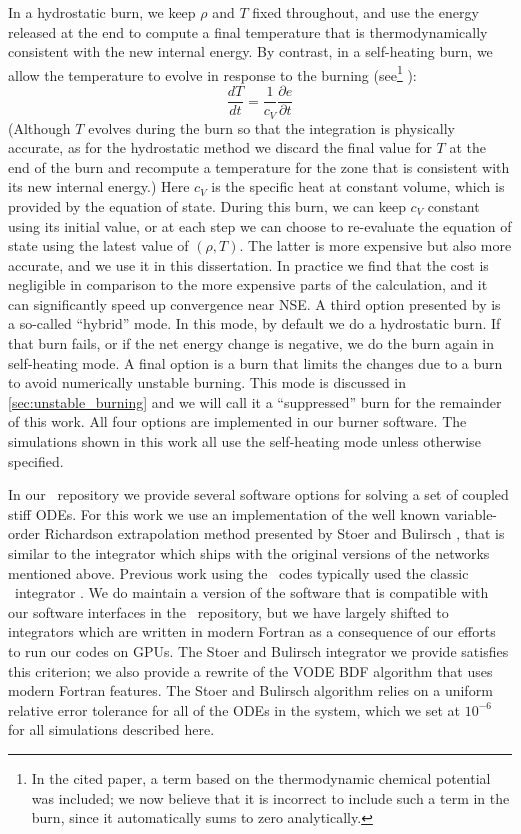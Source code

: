 \documentclass[12pt]{article}
\begin{document}
In a hydrostatic burn, we keep $\rho$ and $T$ fixed throughout, and use
the energy released at the end to compute a final temperature that is
thermodynamically consistent with the new internal energy. By contrast,
in a self-heating burn, we allow the temperature to evolve in response
to the burning (see\footnote{In the cited paper, a term based on the
thermodynamic chemical potential was included; we now believe
that it is incorrect to include such a term in the burn, since it
automatically sums to zero analytically.} \citet{maestro3}):
\begin{equation}
  \frac{dT}{dt} = \frac{1}{c_V}\frac{\partial e}{\partial t}
\end{equation}
(Although $T$ evolves during the burn so that the integration is physically
accurate, as for the hydrostatic method we discard the final value
for $T$ at the end of the burn and recompute a temperature for the zone that is
consistent with its new internal energy.) Here $c_V$ is the specific heat at
constant volume, which is provided by the equation of state.  During this burn,
we can keep $c_V$ constant using its initial value, or at each step we
can choose to re-evaluate the equation of state using the latest value of $(\rho, T)$.
The latter is more expensive but also more accurate, and we use it in this dissertation.
In practice we find that the cost is negligible in comparison to the more expensive
parts of the calculation, and it can significantly speed up convergence near NSE.
A third option presented by \citet{raskin:2010} is a so-called ``hybrid'' mode.
In this mode, by default we do a hydrostatic burn. If that burn fails, or if the net
energy change is negative, we do the burn again in self-heating mode. A final option
is a burn that limits the changes due to a burn to avoid numerically unstable burning.
This mode is discussed in \autoref{sec:unstable_burning} and we will call it a
``suppressed'' burn for the remainder of this work. All four options
are implemented in our burner software. The simulations shown in this work all
use the self-heating mode unless otherwise specified.

In our \microphysics\ repository we provide several software options for
solving a set of coupled stiff ODEs. For this work we use an implementation of
the well known variable-order Richardson extrapolation method presented by Stoer and
Bulirsch \cite{stoer:1980}, that is similar to the integrator which ships with
the original versions of the networks mentioned above. Previous work using the \boxlib\
codes typically used the classic \vode\ integrator \cite{vode}. We do maintain a version
of the software that is compatible with our software interfaces in the \microphysics\
repository, but we have largely shifted to integrators which are written in modern
Fortran as a consequence of our efforts to run our codes on GPUs. The Stoer and Bulirsch
integrator we provide satisfies this criterion; we also provide a rewrite of the VODE
BDF algorithm that uses modern Fortran features. The Stoer and Bulirsch algorithm
relies on a uniform relative error tolerance for all of the ODEs in the system, which
we set at $10^{-6}$ for all simulations described here.
\end{document}
